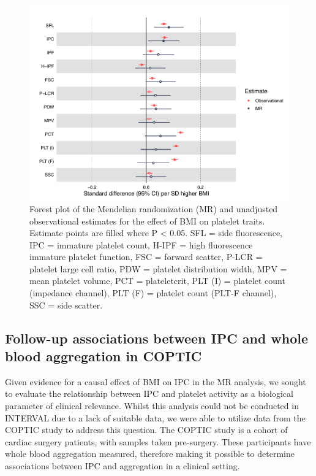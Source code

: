 \documentclass[11pt,twoside]{bristolthesis}
\begin{document}
\begin{figure}
\includegraphics[width=0.9\linewidth]{figure/BMI_platelets/BMI_platelet_forestplot} \caption[Forest plot of the Mendelian randomization and unadjusted observational estimates for the effect of BMI on platelet traits.]{Forest plot of the Mendelian randomization (MR) and unadjusted observational estimates for the effect of BMI on platelet traits. Estimate points are filled where P < 0.05. SFL = side fluorescence, IPC = immature platelet count, H-IPF = high fluorescence immature platelet function, FSC = forward scatter, P-LCR = platelet large cell ratio, PDW = platelet distribution width, MPV = mean platelet volume, PCT = plateletcrit, PLT (I) = platelet count (impedance channel), PLT (F) = platelet count (PLT-F channel), SSC = side scatter.}\label{fig:BMI-platelet-forest}
\end{figure}
\hypertarget{follow-up-associations-between-ipc-and-whole-blood-aggregation-in-coptic}{%
\subsection{Follow-up associations between IPC and whole blood aggregation in COPTIC}\label{follow-up-associations-between-ipc-and-whole-blood-aggregation-in-coptic}}

Given evidence for a causal effect of BMI on IPC in the MR analysis, we sought to evaluate the relationship between IPC and platelet activity as a biological parameter of clinical relevance. Whilst this analysis could not be conducted in INTERVAL due to a lack of suitable data, we were able to utilize data from the COPTIC study to address this question. The COPTIC study is a cohort of cardiac surgery patients, with samples taken pre-surgery. These participants have whole blood aggregation measured, therefore making it possible to determine associations between IPC and aggregation in a clinical setting.
\end{document}
